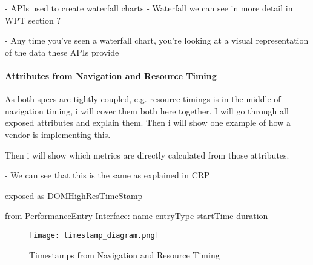 
- APIs used to create waterfall charts
- Waterfall we can see in more detail in WPT section ?

- Any time you've seen a waterfall chart, you're looking at a visual representation of the data these APIs provide







\paragraph{Attributes from Navigation and Resource Timing}


As both specs are tightly coupled, e.g. resource timings is in the middle of navigation timing, i will cover them both here together.
I will go through all exposed attributes and explain them.
Then i will show one example of how a vendor is implementing this.

Then i will show which metrics are directly calculated from those attributes.




- We can see that this is the same as explained in CRP

exposed as DOMHighResTimeStamp


from PerformanceEntry Interface:
name
entryType
startTime
duration


\begin{figure}[h!]
\begin{center}
\texttt{[image: timestamp\_diagram.png]}
\caption{Timestamps from Navigation and Resource Timing}
\label{img:latency}
\end{center}
\end{figure}



